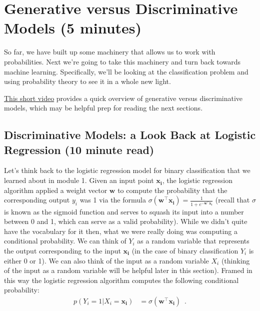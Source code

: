 \documentclass[assignment03_Solutions]{subfiles}
\begin{document}


\section{Generative versus Discriminative Models (5 minutes)}
So far, we have built up some machinery that allows us to work with probabilities.  Next we're going to take this machinery and turn back towards machine learning.  Specifically, we'll be looking at the classification problem and using probability theory to see it in a whole new light.

\href{https://www.youtube.com/watch?v=HHNESCbZqUg}{This short video} provides a quick overview of generative versus discriminative models, which may be helpful prep for reading the next sections.


\subsection{Discriminative Models: a Look Back at Logistic Regression (10 minute read)}

Let's think back to the logistic regression model for binary classification that we learned about in module 1.  Given an input point $\mathbf{x_i}$, the logistic regression algorithm applied a weight vector $\mathbf{w}$ to compute the probability that the corresponding output $y_i$ was 1 via the formula $\sigma(\mathbf{w}^\top \mathbf{x_i}) = \frac{1}{1+e^{-\mathbf{w}^\top \mathbf{x_i}}}$ (recall that $\sigma$ is known as the sigmoid function and serves to squash its input into a number between 0 and 1, which can serve as a valid probability).  While we didn't quite have the vocabulary for it then, what we were really doing was computing a conditional probability.  We can think of $Y_i$ as a random variable that represents the output corresponding to the input $\mathbf{x_i}$ (in the case of binary classification $Y_i$ is either 0 or 1).  We can also think of the input as a random variable $X_i$ (thinking of the input as a random variable will be helpful later in this section).  Framed in this way the logistic regression algorithm computes the following conditional probability:
\begin{align}
p(Y_i = 1 | X_i = \mathbf{x_i}) &= \sigma(\mathbf{w}^\top \mathbf{x_i}) \enspace .
\end{align}
\end{document}
